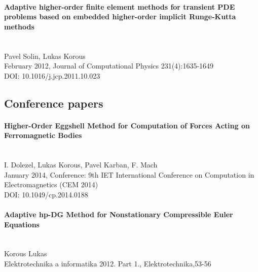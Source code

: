 \paragraph{Adaptive higher-order finite element methods for transient PDE problems based on embedded higher-order implicit Runge-Kutta methods}\ \\
Pavel Solin, Lukas Korous\\
February 2012, Journal of Computational Physics 231(4):1635-1649\\
DOI: 10.1016/j.jcp.2011.10.023\\

\subsection*{Conference papers}
\paragraph{Higher-Order Eggshell Method for Computation of Forces Acting on Ferromagnetic Bodies}\ \\
I. Dolezel, Lukas Korous, Pavel Karban, F. Mach\\
January 2014, Conference: 9th IET International Conference on Computation in Electromagnetics (CEM 2014)\\
DOI: 10.1049/cp.2014.0188\\

\paragraph{Adaptive hp-DG Method for Nonstationary Compressible Euler Equations}\ \\
Korous Lukas\\
Elektrotechnika a informatika 2012. Part 1., Elektrotechnika,53-56\\

